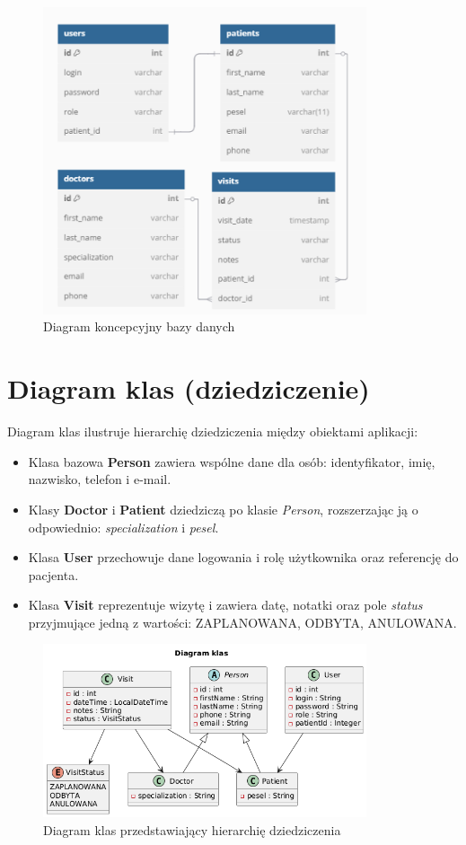 \begin{figure}[H]
\centering
\includegraphics[width=0.85\textwidth]{figures/Diagram_bazy_danych.png}
\caption{Diagram koncepcyjny bazy danych}
\end{figure}

\section{Diagram klas (dziedziczenie)}
Diagram klas ilustruje hierarchię dziedziczenia między obiektami aplikacji:
\begin{itemize}
    \item Klasa bazowa \textbf{Person} zawiera wspólne dane dla osób: identyfikator, imię, nazwisko, telefon i e-mail.
    \item Klasy \textbf{Doctor} i \textbf{Patient} dziedziczą po klasie \textit{Person}, rozszerzając ją o odpowiednio: \textit{specialization} i \textit{pesel}.
    \item Klasa \textbf{User} przechowuje dane logowania i rolę użytkownika oraz referencję do pacjenta.
    \item Klasa \textbf{Visit} reprezentuje wizytę i zawiera datę, notatki oraz pole \textit{status} przyjmujące jedną z wartości: ZAPLANOWANA, ODBYTA, ANULOWANA.
\end{itemize}
\begin{figure}[H]
\centering
\includegraphics[width=0.85\textwidth]{figures/DiagramKlas.png}
\caption{Diagram klas przedstawiający hierarchię dziedziczenia}
\end{figure}

